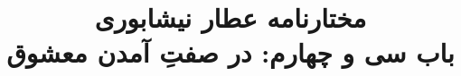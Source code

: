 \documentclass[14pt,b5paper]{article}
\begin{document}
\title{\Huge مختارنامه عطار نیشابوری \\
باب سی و چهارم: در صفتِ آمدن معشوق}
\author{ }
\date{ }
\maketitle
\newpage
\tableofcontents
\newpage

\newpage

\newpage

\newpage

\newpage

\newpage

\newpage

\newpage

\newpage

\newpage

\newpage

\newpage

\newpage

\newpage

\newpage

\newpage

\newpage

\newpage

\newpage

\newpage

\newpage

\newpage

\newpage

\newpage

\newpage

\newpage

\newpage

\newpage

\newpage

\newpage

\newpage

\newpage

\newpage

\newpage

\newpage

\newpage

\newpage

\newpage

\newpage
\end{document}
